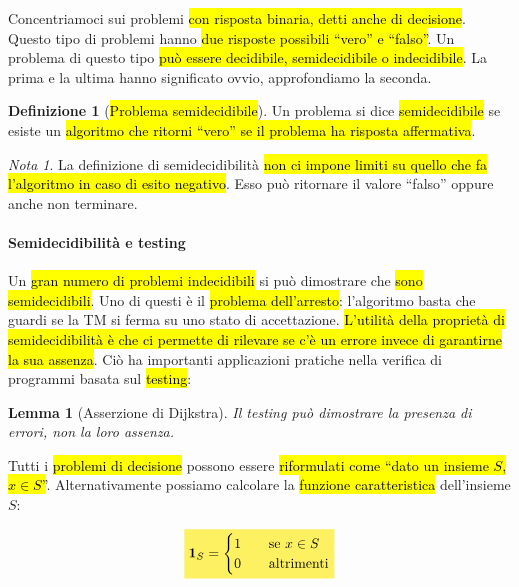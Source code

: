 \documentclass[a4paper,11pt,twoside]{article}
\theoremstyle{plain}
\newtheorem{lem}{Lemma}[section]
\theoremstyle{definition}
\newtheorem{defn}{Definizione}[section]
\theoremstyle{remark}
\newtheorem*{nota}{Nota}
\newcommand{\mhl}[1]{\colorbox{hlcolor}{$\displaystyle #1$}}
\begin{document}
Concentriamoci sui problemi \hl{con risposta binaria, detti anche di decisione}.
Questo tipo di problemi hanno \hl{due risposte possibili ``vero'' e ``falso''}.
Un problema di questo tipo \hl{può essere decidibile, semidecidibile o
indecidibile}. La prima e la ultima hanno significato ovvio, approfondiamo la
seconda.

\begin{defn}[\hl{Problema semidecidibile}]\label{def:problema-semidecidibile}
  Un problema si dice \hl{semidecidibile} se esiste un \hl{algoritmo che ritorni
  ``vero'' se il problema ha risposta affermativa}.
\end{defn}

\begin{nota}
  La definizione di semidecidibilità \hl{non ci impone limiti su quello che fa
  l'algoritmo in caso di esito negativo}. Esso può ritornare il valore ``falso''
  oppure anche non terminare.
\end{nota}

\paragraph{Semidecidibilità e testing} Un \hl{gran numero di problemi
indecidibili} si può dimostrare che \hl{sono semidecidibili}. Uno di questi è il
\hl{problema dell'arresto}: l'algoritmo basta che guardi se la TM si ferma su
uno stato di accettazione. \hl{L'utilità della proprietà di semidecidibilità è
che ci permette di rilevare se c'è un errore invece di garantirne la sua
assenza}. Ciò ha importanti applicazioni pratiche nella verifica di programmi
basata sul \hl{testing}:

\begin{lem}[Asserzione di Dijkstra]
  Il testing può dimostrare la presenza di errori, non la loro assenza.
\end{lem}

Tutti i \hl{problemi di decisione} possono essere \hl{riformulati come ``dato un
insieme $S$, $x \in S$''}. Alternativamente possiamo calcolare la \hl{funzione
caratteristica} dell'insieme $S$:

\begin{equation}
  \mhl{
    \mathbf{1}_{S} =
    \begin{cases}
      1 & \quad \text{se } x \in S \\
      0 & \quad \text{altrimenti}
    \end{cases}
  }
\end{equation}
\end{document}
